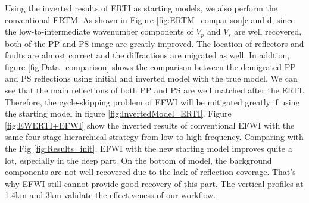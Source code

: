 Using the inverted results of ERTI as starting models, we also perform the conventional ERTM. 
As shown in Figure \ref{fig:ERTM_comparison}c and d, 
since the low-to-intermediate wavenumber components of $V_p$ and $V_s$ are well recovered,
both of the PP and PS image are greatly improved. The location of reflectors and faults are almost correct and the
diffractions are migrated as well. 
In addtion, figure \ref{fig:Data_comparison} shows the comparison between the demigrated PP and PS
reflections using initial and inverted model with
the true model. We can see that the main reflections of both PP and PS are well matched after the
ERTI. Therefore, the cycle-skipping problem of EFWI will be mitigated greatly if using the starting model in
figure \ref{fig:InvertedModel_ERTI}.
Figure
\ref{fig:EWERTI+EFWI} show the inverted results of conventional EFWI with the same
four-stage hierarchical strategy from low to high frequency. Comparing with the 
Fig \ref{fig:Results_init}, EFWI with the new starting model improves quite a lot,
especially in the deep part. 
On the bottom of model, the background components are not well recovered due to
the lack of reflection coverage.
That's why EFWI still cannot provide good recovery of this part.
The vertical profiles at 1.4km and 3km validate the effectiveness of
our workflow.

